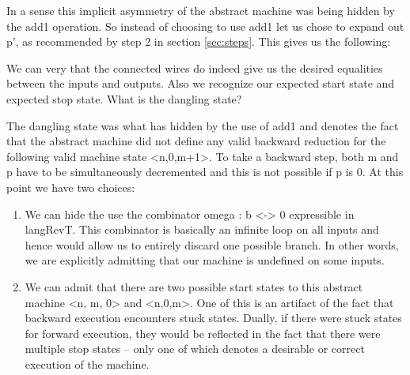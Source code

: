 \documentclass{llncs}
\begin{document}
{In a sense this implicit asymmetry of the abstract machine was being
hidden by the {{add1}} operation. So instead of choosing to use
{{add1}} let us chose to expand out {{p'}}, as recommended by step 2
in section \ref{sec:steps}. This gives us the following: 


\begin{center}
\end{center}

We can very that the connected wires do indeed give us the desired
equalities between the inputs and outputs. Also we recognize our
expected start state and expected stop state. What is the dangling
state?

The dangling state was what has hidden by the use of {{add1}} and
denotes the fact that the abstract machine did not define any valid
backward reduction for the following valid machine state
{{<n,0,m+1>}}. To take a backward step, both {{m}} and {{p}} have to
be simultaneously decremented and this is not possible if {{p}} is
{{0}}.  At this point we have two choices:

\begin{enumerate}
\item We can hide the use the combinator {{omega : b <-> 0}}
  expressible in {{langRevT}}. This combinator is basically an
  infinite loop on all inputs and hence would allow us to entirely
  discard one possible branch. In other words, we are explicitly
  admitting that our machine is undefined on some inputs.

\item We can admit that there are two possible start states to this
  abstract machine {{<n, m, 0>}} and {{<n,0,m>}}. One of this is an
  artifact of the fact that backward execution encounters stuck
  states. Dually, if there were stuck states for forward execution,
  they would be reflected in the fact that there were multiple stop
  states -- only one of which denotes a desirable or correct execution
  of the machine.


\end{enumerate}}
\end{document}
